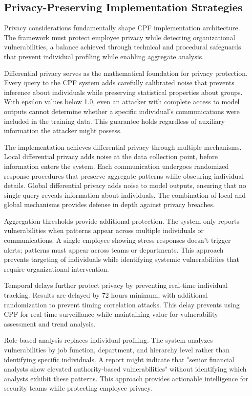 \documentclass[11pt,a4paper]{article}
\begin{document}
\subsection{Privacy-Preserving Implementation Strategies}

Privacy considerations fundamentally shape CPF implementation architecture. The framework must protect employee privacy while detecting organizational vulnerabilities, a balance achieved through technical and procedural safeguards that prevent individual profiling while enabling aggregate analysis.

Differential privacy serves as the mathematical foundation for privacy protection. Every query to the CPF system adds carefully calibrated noise that prevents inference about individuals while preserving statistical properties about groups. With epsilon values below 1.0, even an attacker with complete access to model outputs cannot determine whether a specific individual's communications were included in the training data. This guarantee holds regardless of auxiliary information the attacker might possess.

The implementation achieves differential privacy through multiple mechanisms. Local differential privacy adds noise at the data collection point, before information enters the system. Each communication undergoes randomized response procedures that preserve aggregate patterns while obscuring individual details. Global differential privacy adds noise to model outputs, ensuring that no single query reveals information about individuals. The combination of local and global mechanisms provides defense in depth against privacy breaches.

Aggregation thresholds provide additional protection. The system only reports vulnerabilities when patterns appear across multiple individuals or communications. A single employee showing stress responses doesn't trigger alerts; patterns must appear across teams or departments. This approach prevents targeting of individuals while identifying systemic vulnerabilities that require organizational intervention.

Temporal delays further protect privacy by preventing real-time individual tracking. Results are delayed by 72 hours minimum, with additional randomization to prevent timing correlation attacks. This delay prevents using CPF for real-time surveillance while maintaining value for vulnerability assessment and trend analysis.

Role-based analysis replaces individual profiling. The system analyzes vulnerabilities by job function, department, and hierarchy level rather than identifying specific individuals. A report might indicate that "senior financial analysts show elevated authority-based vulnerabilities" without identifying which analysts exhibit these patterns. This approach provides actionable intelligence for security teams while protecting employee privacy.
\end{document}
